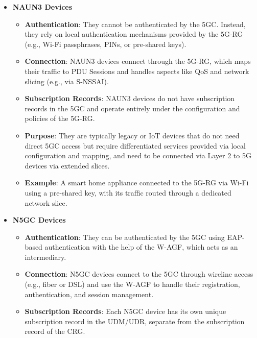 \begin{itemize}
    \item {
        \textbf{\ac{NAUN3} Devices}
        \begin{itemize}
            \item {
                \textbf{Authentication}: They cannot be authenticated by the \ac{5GC}. Instead, they rely on local authentication mechanisms provided by the \ac{5G-RG} (e.g., Wi-Fi passphrases, \acp{PIN}, or pre-shared keys).
            }
            \item {
                \textbf{Connection}: \ac{NAUN3} devices connect through the \ac{5G-RG}, which maps their traffic to \ac{PDU} Sessions and handles aspects like \ac{QoS} and network slicing (e.g., via \ac{S-NSSAI}).
            }
            \item {
                \textbf{Subscription Records}: \ac{NAUN3} devices do not have subscription records in the \ac{5GC} and operate entirely under the configuration and policies of the \ac{5G-RG}.
            }
            \item {
                \textbf{Purpose}: They are typically legacy or \ac{IoT} devices that do not need direct \ac{5GC} access but require differentiated services provided via local configuration and mapping, and need to be connected via Layer 2 to \ac{5G} devices via extended slices.
            }
            \item {
                \textbf{Example}: A smart home appliance connected to the \ac{5G-RG} via Wi-Fi using a pre-shared key, with its traffic routed through a dedicated network slice.
            }
        \end{itemize}    
    }
    \item {
        \textbf{\ac{N5GC} Devices}
        \begin{itemize}
            \item {
                \textbf{Authentication}: They can be authenticated by the \ac{5GC} using \ac{EAP}-based authentication with the help of the \ac{W-AGF}, which acts as an intermediary.
            }
            \item {
                \textbf{Connection}: \ac{N5GC} devices connect to the \ac{5GC} through wireline access (e.g., fiber or \ac{DSL}) and use the \ac{W-AGF} to handle their registration, authentication, and session management.
            }
            \item {
                \textbf{Subscription Records}: Each \ac{N5GC} device has its own unique subscription record in the \ac{UDM}/\ac{UDR}, separate from the subscription record of the \ac{CRG}.
}
\end{itemize}}
\end{itemize}
